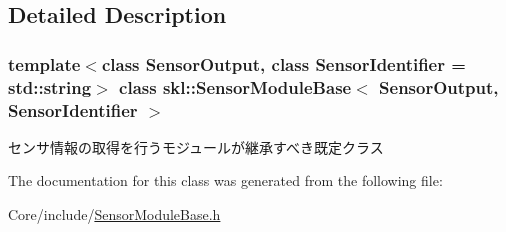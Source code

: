 \subsection{Detailed Description}
\subsubsection*{template$<$class Sensor\+Output, class Sensor\+Identifier = std\+::string$>$\newline
class skl\+::\+Sensor\+Module\+Base$<$ Sensor\+Output, Sensor\+Identifier $>$}

センサ情報の取得を行うモジュールが継承すべき既定クラス 

The documentation for this class was generated from the following file\+:\begin{DoxyCompactItemize}
\item 
Core/include/\hyperlink{_sensor_module_base_8h}{Sensor\+Module\+Base.\+h}\end{DoxyCompactItemize}
